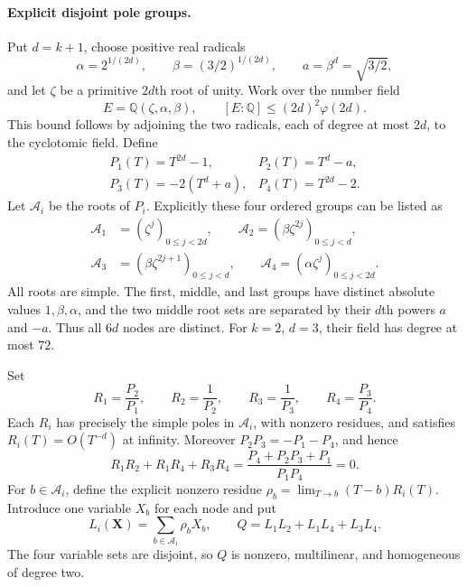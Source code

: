 \paragraph{Explicit disjoint pole groups.}
Put $d=k+1$, choose positive real radicals
\[
 \alpha=2^{1/(2d)},\qquad \beta=(3/2)^{1/(2d)},
 \qquad a=\beta^d=\sqrt{3/2},
\]
and let $\zeta$ be a primitive $2d$th root of unity. Work over the
number field
\[
 E=\mathbb Q(\zeta,\alpha,\beta),\qquad
 [E:\mathbb Q]\le(2d)^2\varphi(2d).
 \tag{P16.3}
\]
This bound follows by adjoining the two radicals, each of degree at
most $2d$, to the cyclotomic field. Define
\[
 \begin{array}{ll}
 P_1(T)=T^{2d}-1,&P_2(T)=T^d-a,\\
 P_3(T)=-2(T^d+a),&P_4(T)=T^{2d}-2.
 \end{array}
\]
Let $\mathcal A_i$ be the roots of $P_i$. Explicitly these four
ordered groups can be listed as
\[
 \begin{split}
 \mathcal A_1&=(\zeta^j)_{0\le j<2d},\qquad
 \mathcal A_2=(\beta\zeta^{2j})_{0\le j<d},\\
 \mathcal A_3&=(\beta\zeta^{2j+1})_{0\le j<d},\qquad
 \mathcal A_4=(\alpha\zeta^j)_{0\le j<2d}.
 \end{split}
 \tag{P16.4}
\]
All roots are simple. The first, middle, and last groups have distinct
absolute values $1,\beta,\alpha$, and the two middle root sets are
separated by their $d$th powers $a$ and $-a$. Thus all $6d$ nodes
are distinct. For $k=2$, $d=3$, their field has degree at most $72$.

Set
\[
 R_1=\frac{P_2}{P_1},\qquad R_2=\frac1{P_2},\qquad
 R_3=\frac1{P_3},\qquad R_4=\frac{P_3}{P_4}.
 \tag{P16.5}
\]
Each $R_i$ has precisely the simple poles in $\mathcal A_i$, with
nonzero residues, and satisfies $R_i(T)=O(T^{-d})$ at infinity.
Moreover $P_2P_3=-P_1-P_4$, and hence
\[
 R_1R_2+R_1R_4+R_3R_4
 =\frac{P_4+P_2P_3+P_1}{P_1P_4}=0.
 \tag{P16.6}
\]
For $b\in\mathcal A_i$, define the explicit nonzero residue
$\rho_b=\lim_{T\to b}(T-b)R_i(T)$. Introduce one variable $X_b$ for
each node and put
\[
 L_i(\mathbf X)=\sum_{b\in\mathcal A_i}\rho_bX_b,
 \qquad
 Q=L_1L_2+L_1L_4+L_3L_4.
 \tag{P16.7}
\]
The four variable sets are disjoint, so $Q$ is nonzero, multilinear,
and homogeneous of degree two.

